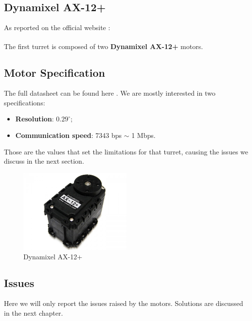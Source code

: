 \subsection{Dynamixel AX-12+}
As reported on the official website \cite{web-AX-12}:\\ \\
The first turret is composed of two \textbf{Dynamixel AX-12+} motors.
\subsection{Motor Specification}
The full datasheet can be found here \cite{datasheet-AX-12}. We are mostly interested in two specifications: 
\begin{itemize}
    \item \textbf{Resolution}: $0.29^{\circ}$;
    \item \textbf{Communication speed}: 7343 bps $\sim$ 1 Mbps.
\end{itemize}
Those are the values that set the limitations for that turret, causing the issues we discuss in the next section.
\begin{figure}
	\centering
	\includegraphics[width=0.5\textwidth]{img/ax12+.jpg}%
	\caption{Dynamixel AX-12+}
	\label{fig:ax12+}
\end{figure}
\subsection{Issues}\label{subs:firstModel:issues}
Here we will only report the issues raised by the motors. Solutions are discussed in the next chapter.
